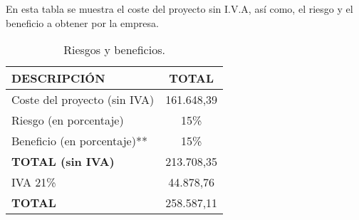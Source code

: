 En esta tabla se muestra el coste del proyecto sin I.V.A, así como, el riesgo y el beneficio a obtener por la empresa.
\begin{table}[H]
\begin{center}
\begin{tabular}{l c}
\textbf{DESCRIPCIÓN} & \textbf{TOTAL}\\ \hline \hline
Coste del proyecto (sin IVA) &  161.648,39\\
Riesgo (en porcentaje) & 15\% \\
Beneficio (en porcentaje)** & 15\% \\ \hline \hline
\textbf{TOTAL (sin IVA)} & 213.708,35\\ \hline \hline
IVA 21\% & 44.878,76 \\\hline \hline
\textbf{TOTAL} & 258.587,11\\ \hline
\end{tabular}
\caption{Riesgos y beneficios.}
\label{tab:total}
\end{center}
\end{table}
